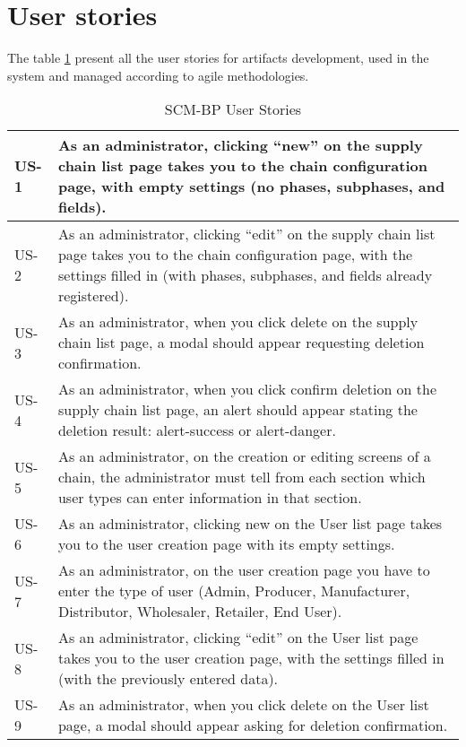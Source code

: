 \section{User stories}{} %

The table \ref{table:userStories} present all the user stories for artifacts development, used in the system and managed according to agile methodologies.

\begin{table}[H]
\caption{\ac{SCM-BP} User Stories}
\label{table:userStories}
    \begin{tabular}{|l|p{13.5cm}|}
    \hline 
    US-1  & As an administrator, clicking “new” on the supply chain list page takes you to the chain configuration page, with empty settings (no phases, subphases, and fields).\\
    \hline 
    US-2  & As an administrator, clicking “edit” on the supply chain list page takes you to the chain configuration page, with the settings filled in (with phases, subphases, and fields already registered). \\
    \hline
    US-3  & As an administrator, when you click delete on the supply chain list page, a modal should appear requesting deletion confirmation.\\
    \hline
    US-4  & As an administrator, when you click confirm deletion on the supply chain list page, an alert should appear stating the deletion result: alert-success or alert-danger.\\
    \hline
    US-5  & As an administrator, on the creation or editing screens of a chain, the administrator must tell from each section which user types can enter information in that section.\\
    \hline
    US-6  & As an administrator, clicking new on the User list page takes you to the user creation page with its empty settings.\\
    \hline
    US-7  & As an administrator, on the user creation page you have to enter the type of user (Admin, Producer, Manufacturer, Distributor, Wholesaler, Retailer, End User).\\
    \hline
    US-8  & As an administrator, clicking “edit” on the User list page takes you to the user creation page, with the settings filled in (with the previously entered data).\\
    \hline
    US-9  & As an administrator, when you click delete on the User list page, a modal should appear asking for deletion confirmation.\\

\end{tabular}
\end{table}
